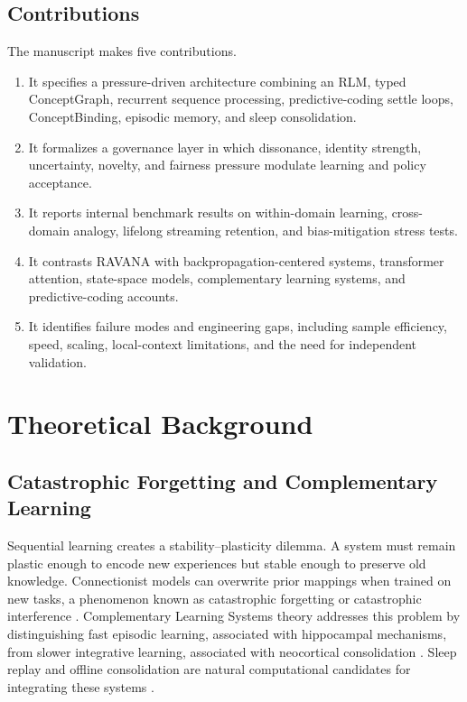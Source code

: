 \documentclass[11pt]{article}
\begin{document}
\subsection{Contributions}
The manuscript makes five contributions.
\begin{enumerate}[leftmargin=*]
    \item It specifies a pressure-driven architecture combining an RLM, typed ConceptGraph, recurrent sequence processing, predictive-coding settle loops, ConceptBinding, episodic memory, and sleep consolidation.
    \item It formalizes a governance layer in which dissonance, identity strength, uncertainty, novelty, and fairness pressure modulate learning and policy acceptance.
    \item It reports internal benchmark results on within-domain learning, cross-domain analogy, lifelong streaming retention, and bias-mitigation stress tests.
    \item It contrasts RAVANA with backpropagation-centered systems, transformer attention, state-space models, complementary learning systems, and predictive-coding accounts.
    \item It identifies failure modes and engineering gaps, including sample efficiency, speed, scaling, local-context limitations, and the need for independent validation.
\end{enumerate}

\section{Theoretical Background}
\subsection{Catastrophic Forgetting and Complementary Learning}
Sequential learning creates a stability--plasticity dilemma. A system must remain plastic enough to encode new experiences but stable enough to preserve old knowledge. Connectionist models can overwrite prior mappings when trained on new tasks, a phenomenon known as catastrophic forgetting or catastrophic interference \cite{mccloskey1989,french1999}. Complementary Learning Systems theory addresses this problem by distinguishing fast episodic learning, associated with hippocampal mechanisms, from slower integrative learning, associated with neocortical consolidation \cite{mcclelland1995,kumaran2016}. Sleep replay and offline consolidation are natural computational candidates for integrating these systems \cite{wilson1994,ji2007,diekelmann2010}.
\end{document}
